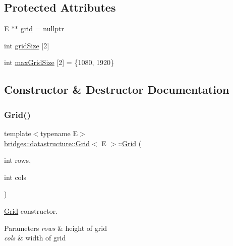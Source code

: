 \subsection*{Protected Attributes}
\begin{DoxyCompactItemize}
\item 
E $\ast$$\ast$ \hyperlink{classbridges_1_1datastructure_1_1_grid_aa29a07fad530eacd55e6244471ec4ecb}{grid} = nullptr
\item 
int \hyperlink{classbridges_1_1datastructure_1_1_grid_a97738e6230af3e7e593e93ecfde0b731}{grid\+Size} \mbox{[}2\mbox{]}
\item 
int \hyperlink{classbridges_1_1datastructure_1_1_grid_acb1cca7db5fb42a0b107885f9e00ff67}{max\+Grid\+Size} \mbox{[}2\mbox{]} = \{1080, 1920\}
\end{DoxyCompactItemize}


\subsection{Constructor \& Destructor Documentation}
\mbox{\label{classbridges_1_1datastructure_1_1_grid_a80d8bca9d3793d896a92168a54ce7b2b}} 
\subsubsection{\texorpdfstring{Grid()}{Grid()}\hspace{0.1cm}{\footnotesize\ttfamily [1/4]}}
{\footnotesize\ttfamily template$<$typename E$>$ \\
\hyperlink{classbridges_1_1datastructure_1_1_grid}{bridges\+::datastructure\+::\+Grid}$<$ E $>$\+::\hyperlink{classbridges_1_1datastructure_1_1_grid}{Grid} (\begin{DoxyParamCaption}\item[{int}]{rows,  }\item[{int}]{cols }\end{DoxyParamCaption})\hspace{0.3cm}{\ttfamily [inline]}}



\hyperlink{classbridges_1_1datastructure_1_1_grid}{Grid} constructor. 


\begin{DoxyParams}{Parameters}
{\em rows} & height of grid \\
\hline
{\em cols} & width of grid \\
\hline
\end{DoxyParams}
\mbox{\label{classbridges_1_1datastructure_1_1_grid_a41c8c94cd9a22ccf978c5e2b1141c813}} 
